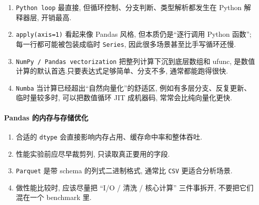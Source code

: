 \documentclass[11pt]{article}
\providecommand{\tightlist}{%
      \setlength{\itemsep}{0pt}\setlength{\parskip}{0pt}}
\begin{document}
    \begin{enumerate}
\def\labelenumi{\arabic{enumi}.}
\item
  \texttt{Python\ loop} 最直接, 但循环控制、分支判断、类型解析都发生在
  Python 解释器层, 开销最高.
\item
  \texttt{apply(axis=1)} 看起来像 Pandas 风格, 但本质仍是``逐行调用
  Python 函数''; 每一行都可能被包装成临时 \texttt{Series},
  因此很多场景甚至比手写循环还慢.
\item
  \texttt{NumPy\ /\ Pandas\ vectorization} 把整列计算下沉到底层数组和
  ufunc, 是数值计算的默认首选.只要表达式足够简单、分支不多,
  通常都能跑得很快.
\item
  \texttt{Numba} 当计算已经超出``自然向量化''的舒适区,
  例如有多层分支、反复更新、临时量较多时, 可以把数值循环 JIT 成机器码,
  常常会比纯向量化更快.
\end{enumerate}

    \paragraph{Pandas
的内存与存储优化}\label{pandas-ux7684ux5185ux5b58ux4e0eux5b58ux50a8ux4f18ux5316}

    \begin{enumerate}
\def\labelenumi{\arabic{enumi}.}
\tightlist
\item
  合适的 \texttt{dtype} 会直接影响内存占用、缓存命中率和整体吞吐.
\item
  性能实验前应尽早裁剪列, 只读取真正要用的字段.
\item
  \texttt{Parquet} 是带 schema 的列式二进制格式, 通常比 \texttt{CSV}
  更适合分析场景.
\item
  做性能比较时, 应该尽量把 ``I/O / 清洗 / 核心计算'' 三件事拆开,
  不要把它们混在一个 benchmark 里.
\end{enumerate}
\end{document}
